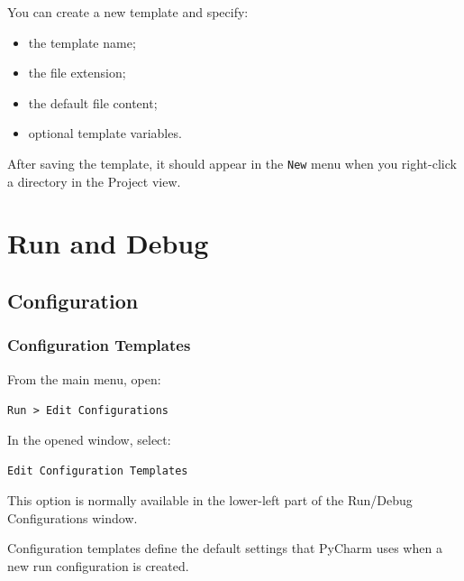 \documentclass[a4paper]{article}
\begin{document}
        You can create a new template and specify:
        
        \begin{itemize}
            \item the template name;
            \item the file extension;
            \item the default file content;
            \item optional template variables.
        \end{itemize}
        
        After saving the template, it should appear in the \texttt{New} menu when you
        right-click a directory in the Project view.
    
    
    \section{Run and Debug}
        
        \subsection{Configuration}
            
            \subsubsection{Configuration Templates}
                
                From the main menu, open:
            
            \begin{center}
                \texttt{Run > Edit Configurations}
                \end{center}
                
                In the opened window, select:
            
            \begin{center}
                \texttt{Edit Configuration Templates}
                \end{center}
                
                This option is normally available in the lower-left part of the Run/Debug
                Configurations window.
                
                Configuration templates define the default settings that PyCharm uses when a
                new run configuration is created.
                
\end{document}
